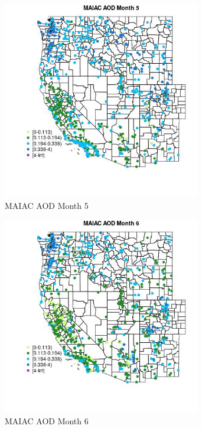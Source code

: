 \begin{figure} 
\centering  
\includegraphics[width=0.77\textwidth]{Code_Outputs/Report_ML_input_PM25_Step4_part_f_de_duplicated_aveswNAs_MapObsMo5MAIAC_AOD.jpg} 
\caption{\label{fig:Report_ML_input_PM25_Step4_part_f_de_duplicated_aveswNAsMapObsMo5MAIAC_AOD}MAIAC AOD Month 5} 
\end{figure} 
 

\begin{figure} 
\centering  
\includegraphics[width=0.77\textwidth]{Code_Outputs/Report_ML_input_PM25_Step4_part_f_de_duplicated_aveswNAs_MapObsMo6MAIAC_AOD.jpg} 
\caption{\label{fig:Report_ML_input_PM25_Step4_part_f_de_duplicated_aveswNAsMapObsMo6MAIAC_AOD}MAIAC AOD Month 6} 
\end{figure} 
 

